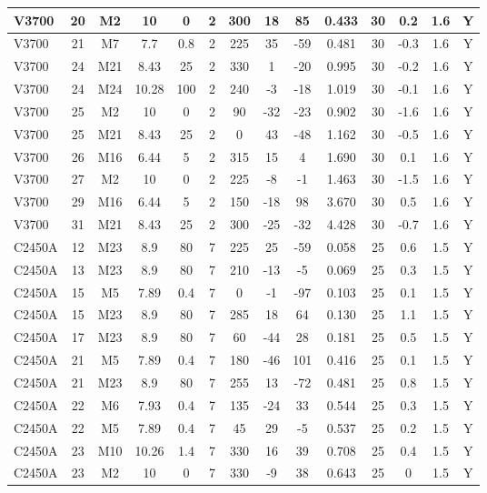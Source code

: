 \documentclass{article}
\begin{document}
\begin{center}
\begin{longtable}{|l|c|c|c|c|c|c|c|c|c|c|c|c|c|}
V3700	&	20	&	M2	&	10	&	0	&	2	&	300	&	18	&	85	&	0.433	&	30	&	0.2	&	1.6	&	Y	\\\hline
V3700	&	21	&	M7	&	7.7	&	0.8	&	2	&	225	&	35	&	-59	&	0.481	&	30	&	-0.3	&	1.6	&	Y	\\\hline
V3700	&	24	&	M21	&	8.43	&	25	&	2	&	330	&	1	&	-20	&	0.995	&	30	&	-0.2	&	1.6	&	Y	\\\hline
V3700	&	24	&	M24	&	10.28	&	100	&	2	&	240	&	-3	&	-18	&	1.019	&	30	&	-0.1	&	1.6	&	Y	\\\hline
V3700	&	25	&	M2	&	10	&	0	&	2	&	90	&	-32	&	-23	&	0.902	&	30	&	-1.6	&	1.6	&	Y	\\\hline
V3700	&	25	&	M21	&	8.43	&	25	&	2	&	0	&	43	&	-48	&	1.162	&	30	&	-0.5	&	1.6	&	Y	\\\hline
V3700	&	26	&	M16	&	6.44	&	5	&	2	&	315	&	15	&	4	&	1.690	&	30	&	0.1	&	1.6	&	Y	\\\hline
V3700	&	27	&	M2	&	10	&	0	&	2	&	225	&	-8	&	-1	&	1.463	&	30	&	-1.5	&	1.6	&	Y	\\\hline
V3700	&	29	&	M16	&	6.44	&	5	&	2	&	150	&	-18	&	98	&	3.670	&	30	&	0.5	&	1.6	&	Y	\\\hline
V3700	&	31	&	M21	&	8.43	&	25	&	2	&	300	&	-25	&	-32	&	4.428	&	30	&	-0.7	&	1.6	&	Y	\\\hline
C2450A	&	12	&	M23	&	8.9	&	80	&	7	&	225	&	25	&	-59	&	0.058	&	25	&	0.6	&	1.5	&	Y	\\\hline
C2450A	&	13	&	M23	&	8.9	&	80	&	7	&	210	&	-13	&	-5	&	0.069	&	25	&	0.3	&	1.5	&	Y	\\\hline
C2450A	&	15	&	M5	&	7.89	&	0.4	&	7	&	0	&	-1	&	-97	&	0.103	&	25	&	0.1	&	1.5	&	Y	\\\hline
C2450A	&	15	&	M23	&	8.9	&	80	&	7	&	285	&	18	&	64	&	0.130	&	25	&	1.1	&	1.5	&	Y	\\\hline
C2450A	&	17	&	M23	&	8.9	&	80	&	7	&	60	&	-44	&	28	&	0.181	&	25	&	0.5	&	1.5	&	Y	\\\hline
C2450A	&	21	&	M5	&	7.89	&	0.4	&	7	&	180	&	-46	&	101	&	0.416	&	25	&	0.1	&	1.5	&	Y	\\\hline
C2450A	&	21	&	M23	&	8.9	&	80	&	7	&	255	&	13	&	-72	&	0.481	&	25	&	0.8	&	1.5	&	Y	\\\hline
C2450A	&	22	&	M6	&	7.93	&	0.4	&	7	&	135	&	-24	&	33	&	0.544	&	25	&	0.3	&	1.5	&	Y	\\\hline
C2450A	&	22	&	M5	&	7.89	&	0.4	&	7	&	45	&	29	&	-5	&	0.537	&	25	&	0.2	&	1.5	&	Y	\\\hline
C2450A	&	23	&	M10	&	10.26	&	1.4	&	7	&	330	&	16	&	39	&	0.708	&	25	&	0.4	&	1.5	&	Y	\\\hline
C2450A	&	23	&	M2	&	10	&	0	&	7	&	330	&	-9	&	38	&	0.643	&	25	&	0	&	1.5	&	Y	\\\hline

\end{longtable}
\end{center}
\end{document}
